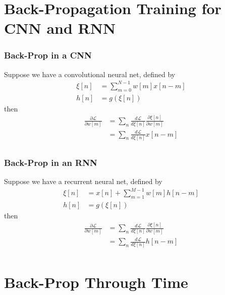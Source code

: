 \documentclass{beamer}
\begin{document}
\section[Back-Prop]{Back-Propagation Training for CNN and RNN}
\setcounter{subsection}{1}

\begin{frame}
  \frametitle{Back-Prop in a CNN}
  Suppose we have a convolutional neural net, defined by
  \begin{align*}
    \xi[n] &= \sum_{m=0}^{N-1}w[m]x[n-m]\\
    h[n] &= g\left(\xi[n]\right)
  \end{align*}
  then 
  \begin{align*}
    \frac{\partial{\mathcal L}}{\partial w[m]}
    & =\sum_n \frac{d{\mathcal L}}{d\xi[n]} \frac{\partial\xi[n]}{\partial w[m]}\\
    & =\sum_n \frac{d{\mathcal L}}{d\xi[n]} x[n-m]\\
  \end{align*}
\end{frame}

\begin{frame}
  \frametitle{Back-Prop in an RNN}
  Suppose we have a recurrent neural net, defined by
  \begin{align*}
    \xi[n] &= x[n] + \sum_{m=1}^{M-1}w[m]h[n-m]\\
    h[n] &= g\left(\xi[n]\right)
  \end{align*}
  then
  \begin{align*}
    \frac{\partial{\mathcal L}}{\partial w[m]}
    & =\sum_n \frac{d{\mathcal L}}{d\xi[n]} \frac{\partial\xi[n]}{\partial w[m]}\\
    & =\sum_n \frac{d{\mathcal L}}{d\xi[n]} h[n-m]\\
  \end{align*}
\end{frame}

\section[BPTT]{Back-Prop Through Time}
\setcounter{subsection}{1}
\end{document}
